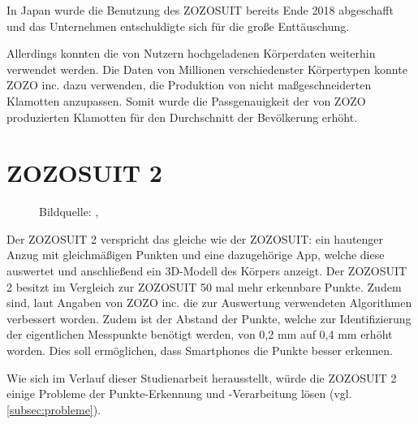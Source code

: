 In Japan wurde die Benutzung des ZOZOSUIT bereits Ende 2018 abgeschafft und das Unternehmen entschuldigte sich für die große Enttäuschung.

Allerdings konnten die von Nutzern hochgeladenen Körperdaten weiterhin verwendet werden. Die Daten von Millionen verschiedenster Körpertypen 
konnte ZOZO inc. dazu verwenden, die Produktion von nicht maßgeschneiderten Klamotten anzupassen. Somit wurde die Passgenauigkeit der von ZOZO 
produzierten Klamotten für den Durchschnitt der Bevölkerung erhöht.

\section{ZOZOSUIT 2}
\label{sec:zozosuit2}

\begin{figure}[H]
    \centering 
    \qquad
    \caption{Bildquelle: \cite{misc:zozopictwo}, \cite{misc:zozopictwopoints}} 
    \label{img:zozotwo}
  \end{figure}

Der ZOZOSUIT 2 verspricht das gleiche wie der ZOZOSUIT: ein hautenger Anzug mit gleichmäßigen Punkten 
und eine dazugehörige App, welche diese auswertet und anschließend ein 3D-Modell des Körpers anzeigt. \newline
Der ZOZOSUIT 2 besitzt im Vergleich zur ZOZOSUIT 50 mal mehr erkennbare Punkte. Zudem sind, laut Angaben von ZOZO inc. 
die zur Auswertung verwendeten Algorithmen verbessert worden. Zudem ist der Abstand der Punkte, welche zur Identifizierung 
der eigentlichen Messpunkte benötigt werden, von 0,2 mm auf 0,4 mm erhöht worden. Dies soll ermöglichen, dass Smartphones die 
Punkte besser erkennen. \cite{misc:zozotwo}

Wie sich im Verlauf dieser Studienarbeit herausstellt, würde die ZOZOSUIT 2 einige Probleme der Punkte-Erkennung und -Verarbeitung lösen (vgl. \ref{subsec:probleme}).
